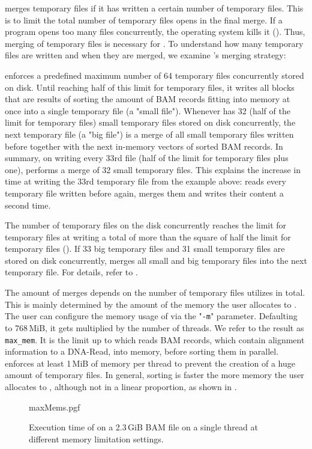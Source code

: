\sort merges temporary files if it has written a certain number of temporary files. This is to limit the total number of temporary files \sort opens in the final merge. If a program opens too many files concurrently, the operating system kills it (). Thus, merging of temporary files is necessary for \sort.
To understand how many temporary files are written and when they are merged, we examine \sort's merging strategy: 

\sort enforces a predefined maximum number of 64 temporary files concurrently stored on disk. Until reaching half of this limit for temporary files, it writes all blocks that are results of sorting the amount of BAM records fitting into memory at once into a single temporary file (a "small file"). Whenever \sort has 32  (half of the limit for temporary files) small temporary files stored on disk concurrently, the next temporary file (a "big file") is a merge of all small temporary files written before together with the next in-memory vectors of sorted BAM records. In summary, on writing every 33rd file (half of the limit for temporary files plus one), \sort performs a merge of 32 small temporary files. This explains the increase in time at writing the 33rd temporary file from the example above: \sort reads every temporary file written before again, merges them and writes their content a second time. 

The number of temporary files on the disk concurrently reaches the limit for temporary files at writing a total of more than the square of half the limit for temporary files (). If 33 big temporary files and 31 small temporary files are stored on disk concurrently, \sort merges all small and big temporary files into the next temporary file. For details, refer to . 

The amount of merges depends on the number of temporary files \sort utilizes in total. This is mainly determined by the amount of the memory the user allocates to \sort. The user can configure the memory usage of \sort via the "\texttt{-m}" parameter. Defaulting to 768\,MiB, it gets multiplied by the number of threads. We refer to the result as \texttt{max\_mem}. It is the limit up to which \sort reads BAM records, which contain alignment information to a DNA-Read, into memory, before sorting them in parallel. 
\sort enforces at least 1\,MiB of memory per thread to prevent the creation of a huge amount of temporary files. In general, sorting is faster the more memory the user allocates to \sort, although not in a linear proportion, as shown in .
\begin{figure}
        {maxMems.pgf}
    \caption{Execution time of \sort on a 2.3\,GiB BAM file on a single thread at different memory limitation settings. \points}
    \label{fig:maxMems}
\end{figure}

